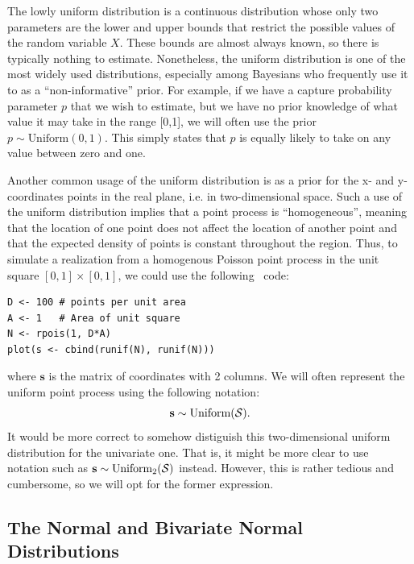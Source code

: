 The %
lowly uniform distribution is a continuous distribution whose
only two parameters are the lower and upper bounds that restrict the
possible values of the random variable $X$. These bounds
are almost always known, so there is typically nothing to
estimate. Nonetheless, the uniform
distribution is one of the most widely used distributions,
especially among Bayesians who frequently use it to as a ``non-informative''
prior. For example, if we
have a capture probability parameter $p$ that we wish to estimate, but
we have no prior knowledge of what value it may take in the range
[0,1], we will often use the prior $p \sim \text{Uniform}(0,1)$. This
simply states that $p$ is equally likely to take on any value between
zero and one.

Another common usage of the uniform distribution is as a prior for the
x- and y- coordinates points in the real plane, i.e. in two-dimensional
space. Such a use of the uniform distribution implies that a point process is
``homogeneous'', meaning that the location of one point does not
affect the location of another point and that the expected density of
points is constant throughout the region. Thus, to simulate a
realization from a homogenous Poisson point process in the unit square
$[0,1] \times [0,1]$, we could use the following \R~code:
\begin{verbatim}
D <- 100 # points per unit area
A <- 1   # Area of unit square
N <- rpois(1, D*A)
plot(s <- cbind(runif(N), runif(N)))
\end{verbatim}
where $\mathbf{s}$ is the matrix of coordinates with 2 columns. We
will often represent the uniform point process using the following notation:
\begin{equation}
  {\bf s} \sim \text{Uniform}(\mathcal{S}).
\end{equation}
It would be more correct to somehow distiguish this
two-dimensional uniform distribution for the univariate one. That is,
it might be more clear to use notation such as
${\bf s} \sim \text{Uniform}_2(\mathcal{S})$ instead. However, this is rather
tedious and cumbersome, so we will opt for the former expression.


\subsection{The Normal and Bivariate Normal Distributions}

